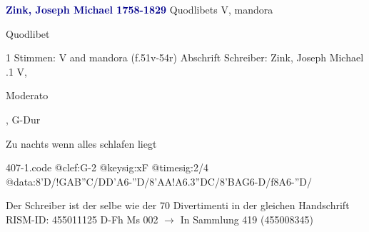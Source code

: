 \documentclass[twocolumn]{book}
\begin{document}
\newline \par \vspace{7pt} \textcolor{darkblue}{\textbf{Zink, Joseph Michael  1758-1829}}
\newline Quodlibets
\newline V, mandora
\newline \begin{itshape}[heading, f.51v:] Quodlibet\end{itshape} 
\newline \textcolor{darkblue}{}  1 Stimmen: V and mandora  (f.51v-54r)
\newline Abschrift
\newline Schreiber: Zink, Joseph Michael
.1  V, \begin{itshape}Moderato\end{itshape}, G-Dur
\newline \begin{footnotesize} Zu nachts wenn alles schlafen liegt \end{footnotesize}  
\begin{filecontents*}{407-1.code}
@clef:G-2
@keysig:xF
@timesig:2/4
@data:8'D/!GAB''C/DD'A6-''D/8'AA!{A6.3''DC}/8'BAG6-D/f8A6-''D/
\end{filecontents*}
\newline
%
\newline Der Schreiber ist der selbe wie der 70 Divertimenti in der gleichen Handschrift
\newline RISM-ID: 455011125
\newline D-Fh  Ms 002
\newline $\rightarrow$ In Sammlung 419 (455008345)
      
\end{document}
